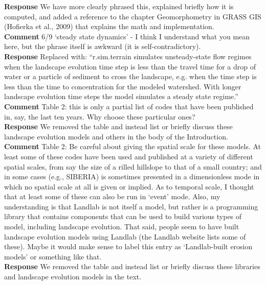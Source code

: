 \documentclass[gmd, manuscript]{copernicus}
\begin{document}
\noindent\textbf{Response}
We have more clearly phrased this, explained briefly how it is computed, and added a reference to the chapter Geomorphometry in GRASS GIS (Hofierka et al., 2009) that explains the math and implementation.
\\

\noindent\textbf{Comment}
6/9 `steady state dynamics' - I think I understand what you mean here, but the phrase itself is awkward (it is self-contradictory).
\\

\noindent\textbf{Response}
Replaced with: ``r.sim.terrain simulates unsteady-state flow regimes when the landscape evolution time step is less than the travel time for a drop of water or a particle of sediment to cross the landscape, e.g. when the time step is less than the time to concentration for the modeled watershed. With longer landscape evolution time steps the model simulates a steady state regime.''
\\

\noindent\textbf{Comment}
Table 2: this is only a partial list of codes that have been published in, say, the last ten years. Why choose these particular ones?
\\

\noindent\textbf{Response}
We removed the table and instead list or briefly discuss these landscape evolution models and others in the body of the Introduction.
\\

\noindent\textbf{Comment}
Table 2: Be careful about giving the spatial scale for these models. At least some of these codes have been used and published at a variety of different spatial scales, from say the size of a rilled hillslope to that of a small country; and in some cases (e.g., SIBERIA) is sometimes presented in a dimensionless mode in which no spatial scale at all is given or implied. As to temporal scale, I thought that at least some of these can also be run in `event' mode. Also, my understanding is that Landlab is not itself a model, but rather is a programming library that contains components that can be used to build various types of model, including landscape evolution. That said, people seem to have built landscape evolution models using Landlab (the Landlab website lists some of these). Maybe it would make sense to label this entry as `Landlab-built erosion models' or something like that.
\\

\noindent\textbf{Response}
We removed the table and instead list or briefly discuss these libraries and landscape evolution models in the text.
\\
\end{document}
